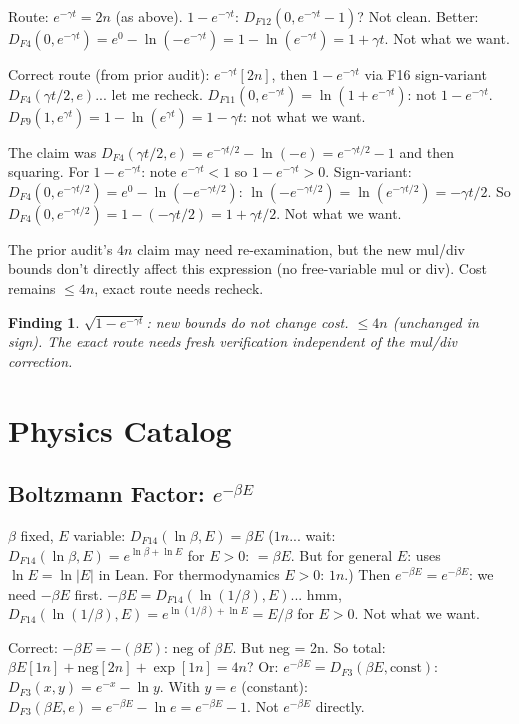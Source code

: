 \documentclass[11pt]{article}
\newtheorem{finding}[theorem]{Finding}
\newcommand{\ok}[1]{\textcolor{ok}{#1}}
\begin{document}
Route: $e^{-\gamma t} = 2n$ (as above). $1 - e^{-\gamma t}$: $D_{F12}(0, e^{-\gamma t} - 1)$? Not clean.
Better: $D_{F4}(0, e^{-\gamma t}) = e^0 - \ln(-e^{-\gamma t}) = 1 - \ln(e^{-\gamma t}) = 1 + \gamma t$.
Not what we want.

Correct route (from prior audit): $e^{-\gamma t}[2n]$, then $1 - e^{-\gamma t}$ via F16 sign-variant
$D_{F4}(\gamma t/2, e)$... let me recheck. $D_{F11}(0, e^{-\gamma t}) = \ln(1 + e^{-\gamma t})$: not $1-e^{-\gamma t}$.
$D_{F9}(1, e^{\gamma t}) = 1 - \ln(e^{\gamma t}) = 1 - \gamma t$: not what we want.

The claim was $D_{F4}(\gamma t / 2, e) = e^{-\gamma t/2} - \ln(-e) = e^{-\gamma t/2} - 1$ and then squaring.
For $1 - e^{-\gamma t}$: note $e^{-\gamma t} < 1$ so $1 - e^{-\gamma t} > 0$.
Sign-variant: $D_{F4}(0, e^{-\gamma t/2}) = e^0 - \ln(-e^{-\gamma t/2})$: $\ln(-e^{-\gamma t/2}) = \ln(e^{-\gamma t/2}) = -\gamma t/2$.
So $D_{F4}(0, e^{-\gamma t/2}) = 1 - (-\gamma t/2) = 1 + \gamma t/2$. Not what we want.

The prior audit's $4n$ claim may need re-examination, but the new mul/div bounds don't directly
affect this expression (no free-variable mul or div). Cost remains $\leq 4n$, exact route needs recheck.

\begin{finding}
$\sqrt{1-e^{-\gamma t}}$: new bounds do not change cost. \ok{$\leq 4n$ (unchanged in sign)}.
The exact route needs fresh verification independent of the mul/div correction.
\end{finding}

\section{Physics Catalog}

\subsection{Boltzmann Factor: $e^{-\beta E}$}

$\beta$ fixed, $E$ variable: $D_{F14}(\ln\beta, E) = \beta E$ ($1n$... wait: $D_{F14}(\ln\beta, E) = e^{\ln\beta + \ln E}$
for $E > 0$: $= \beta E$. But for general $E$: uses $\ln E = \ln|E|$ in Lean. For thermodynamics $E > 0$: $1n$.)
Then $e^{-\beta E} = e^{-\beta E}$: we need $-\beta E$ first. $-\beta E = D_{F14}(\ln(1/\beta), E)$... hmm,
$D_{F14}(\ln(1/\beta), E) = e^{\ln(1/\beta) + \ln E} = E/\beta$ for $E > 0$. Not what we want.

Correct: $-\beta E = -(\beta E)$: neg of $\beta E$. But neg = 2n. So total: $\beta E[1n] + \mathrm{neg}[2n] + \exp[1n] = 4n$?
Or: $e^{-\beta E} = D_{F3}(\beta E, \text{const})$: $D_{F3}(x,y) = e^{-x} - \ln y$.
With $y = e$ (constant): $D_{F3}(\beta E, e) = e^{-\beta E} - \ln e = e^{-\beta E} - 1$.
Not $e^{-\beta E}$ directly.
\end{document}
